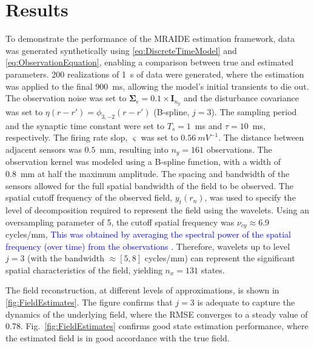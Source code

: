 \documentclass[journal]{IEEEtran}
\newcommand{\dean}[1]{\textcolor{green}{#1}}
\newcommand{\parham}[1]{\textcolor{blue}{#1}}
\newcommand{\ken}[1]{\textsf{\emph{\textbf{\textcolor{magenta}{#1}}}}}
\newcommand{\cut}[1]{\textcolor{cyan}{#1}}
\begin{document}
\section{Results}
To demonstrate the performance of the MRAIDE estimation framework, data was generated synthetically  using \eqref{eq:DiscreteTimeModel} and \eqref{eq:ObservationEquation}, enabling a comparison between true and estimated parameters. 200 realizations of 1~s of data were generated, where the estimation was applied to the final 900~ms, allowing the model's initial transients to die out. The observation noise was set to $\boldsymbol\Sigma_{\epsilon}=0.1 \times \mathbf{I}_{n_y}$ and the disturbance covariance was set to $\eta(r-r') = \phi_{3,-2}(r-r')$ (B-spline, $j=3$). The sampling period and the synaptic time constant were set to $T_s = 1$~ms and $\tau = 10$~ms, respectively. The firing rate slop, $\varsigma$ was set to $0.56~mV^{-1}$. The distance between adjacent sensors was $0.5$~mm, resulting into $n_y = 161$ observations. The observation kernel was modeled using a B-spline function, with a width of 0.8~mm at half the maximum amplitude. The spacing and bandwidth of the sensors allowed for the full spatial bandwidth of the field to be observed.  %
The spatial cutoff frequency of the observed field, $y_t(r_n)$, was used to specify the level of decomposition required to represent the field using the wavelets. Using an oversampling parameter of 5, the cutoff spatial frequency was $\nu_{cy} \approx 6.9 $ cycles/mm, \parham{This was obtained by averaging the spectral power of the spatial frequency (over time) from the observations} \cite{Scerri2009}. Therefore, wavelets up to level $j=3$ (with the bandwidth $\approx[5,8]$ cycles/mm) can represent the significant spatial characteristics of the field, yielding $n_x = 131$ states. 


The field reconstruction, at different levels of approximations, is shown in \figurename{\ref{fig:FieldEstimates}}. The figure confirms that $j=3$ is adequate to capture the dynamics of the underlying field, where the RMSE converges to a steady value of 0.78. Fig.~\ref{fig:FieldEstimates} confirms good state estimation performance, where the estimated field is in good accordance with the true field. 
\end{document}

